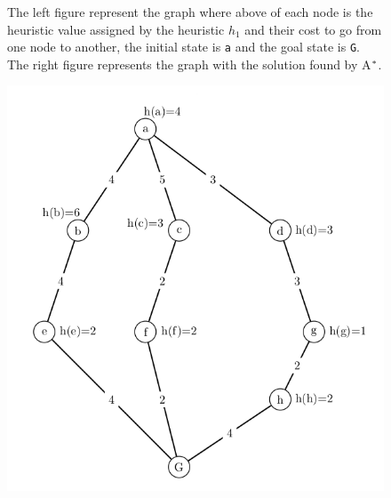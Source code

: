 \begin{figure}[!htb]
\endminipage
\caption{The left figure represent the graph where above of each node is the heuristic value assigned by the heuristic $h_{1}$ and their cost to go from one node to another, the initial state is \texttt{a} and the goal state is \texttt{G}. The right figure represents the graph with the solution found by A$\sp{*}$. }\label{fig:image_h1_astar}
\end{figure}

\begin{figure}[!htb]
  \includegraphics[width=\linewidth]{images/marvinh2full-left}
\endminipage\hfill
{}

\end{figure}
